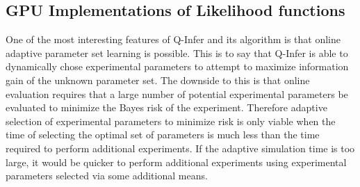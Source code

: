 \subsection{GPU Implementations of Likelihood functions}
\label{sec:gpu}
One of the most interesting features of Q-Infer and its algorithm is that online adaptive parameter set learning is possible. This is to say that Q-Infer is able to dynamically chose experimental parameters to attempt to maximize information gain of the unknown parameter set. The downside to this is that online evaluation requires that a large number of potential experimental parameters be evaluated to minimize the Bayes risk of the experiment. Therefore adaptive selection of experimental parameters to minimize risk is only viable when the time of selecting the optimal set of parameters is much less than the time required to perform additional experiments. If the adaptive simulation time is too large, it would be quicker to perform additional experiments using experimental parameters selected via some additional means.

